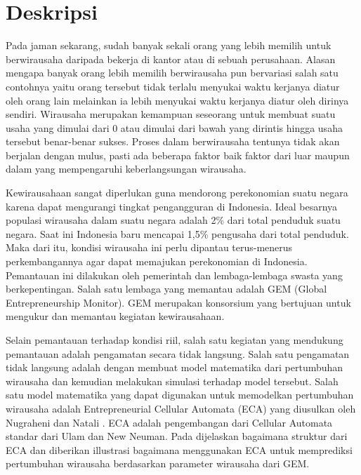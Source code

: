 \documentclass[a4paper,twoside]{article}
\begin{document}
\title{\@judultopik}
\author{\nama \textendash \@npm} 

\newcommand{\nama}{Vanessa Sukamto}
\newcommand{\@npm}{2014730010}
\newcommand{\@judultopik}{Simulator Pertumbuhan Wirausaha Berbasis Cellular Automata} %
\newcommand{\jumpemb}{1} %
\newcommand{\tanggal}{14/02/2018}


\maketitle


\section{Deskripsi}
Pada jaman sekarang, sudah banyak sekali orang yang lebih memilih untuk berwirausaha daripada bekerja di kantor atau di sebuah perusahaan.  Alasan mengapa banyak orang lebih memilih berwirausaha pun bervariasi salah satu contohnya yaitu orang tersebut tidak terlalu menyukai waktu kerjanya diatur oleh orang lain melainkan ia lebih menyukai waktu kerjanya diatur oleh dirinya sendiri. Wirausaha merupakan kemampuan seseorang untuk membuat suatu usaha yang dimulai dari 0 atau dimulai dari bawah yang dirintis hingga usaha tersebut benar-benar sukses. Proses dalam berwirausaha tentunya tidak akan berjalan dengan mulus, pasti ada beberapa faktor baik faktor dari luar maupun dalam yang mempengaruhi keberlangsungan wirausaha.


Kewirausahaan sangat diperlukan guna mendorong perekonomian suatu negara karena dapat mengurangi tingkat pengangguran di Indonesia.  Ideal besarnya populasi wirausaha dalam suatu negara adalah 2\% dari total penduduk suatu negara. Saat ini Indonesia baru mencapai 1,5\% pengusaha dari total penduduk. Maka dari itu, kondisi wirausaha ini perlu dipantau terus-menerus perkembangannya agar dapat memajukan perekonomian di Indonesia. Pemantauan ini dilakukan oleh pemerintah dan lembaga-lembaga swasta yang berkepentingan. Salah satu lembaga yang memantau adalah GEM (Global Entrepreneurship Monitor). GEM merupakan konsorsium yang bertujuan untuk mengukur dan memantau kegiatan kewirausahaan. 

Selain pemantauan terhadap kondisi riil, salah satu kegiatan yang mendukung pemantauan adalah pengamatan secara tidak langsung. Salah satu pengamatan tidak langsung adalah dengan membuat model matematika dari pertumbuhan wirausaha dan kemudian melakukan simulasi terhadap model tersebut. Salah satu model matematika yang dapat digunakan untuk memodelkan pertumbuhan wirausaha adalah Entrepreneurial Cellular Automata (ECA) yang diusulkan oleh Nugraheni dan Natali \footnotemark. ECA adalah pengembangan dari Cellular Automata standar dari Ulam dan New Neuman. Pada \footnotemark[\value{footnote}
] dijelaskan bagaimana struktur dari ECA dan diberikan illustrasi bagaimana menggunakan ECA untuk memprediksi pertumbuhan wirausaha berdasarkan parameter wirausaha dari GEM. 
\end{document}
